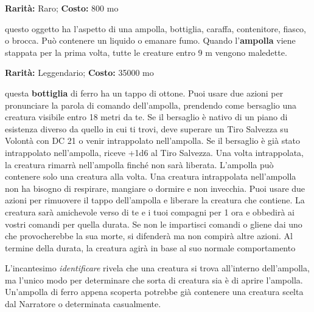 \begin{multicols}{2}

\textbf{Rarità:} Raro; \textbf{Costo:} 800 mo

questo oggetto ha l'aspetto di una ampolla, bottiglia, caraffa, contenitore, fiasco, o brocca. Può contenere un liquido o emanare fumo. Quando l'\textbf{ampolla} viene stappata per la prima volta, tutte le creature entro 9 m vengono maledette.


\textbf{Rarità:} Leggendario; \textbf{Costo:} 35000 mo

questa \textbf{bottiglia} di ferro ha un tappo di ottone. Puoi usare due azioni per pronunciare la parola di comando dell'ampolla, prendendo come bersaglio una creatura visibile entro 18 metri da te. Se il bersaglio è nativo di un piano di esistenza diverso da quello in cui ti trovi, deve superare un Tiro Salvezza su Volontà con DC 21 o venir intrappolato nell'ampolla. Se il bersaglio è già stato intrappolato nell'ampolla, riceve +1d6 al Tiro Salvezza. Una volta intrappolata, la creatura rimarrà nell'ampolla finché non sarà liberata. L'ampolla può contenere solo una creatura alla volta. Una creatura intrappolata nell'ampolla non ha bisogno di respirare, mangiare o dormire e non invecchia. Puoi usare due azioni per rimuovere il tappo dell'ampolla e liberare la creatura che contiene. La creatura sarà amichevole verso di te e i tuoi compagni per 1 ora e obbedirà ai vostri comandi per quella durata. Se non le impartisci comandi o gliene dai uno che provocherebbe la sua morte, si difenderà ma non compirà altre azioni. Al termine della durata, la creatura agirà in base al suo normale comportamento

L'incantesimo \emph{identificare} rivela che una creatura si trova all'interno dell'ampolla, ma l'unico modo per determinare che sorta di creatura sia è di aprire l'ampolla. Un'ampolla di ferro appena scoperta potrebbe già contenere una creatura scelta dal Narratore o determinata casualmente.

\medskip


\end{multicols}
